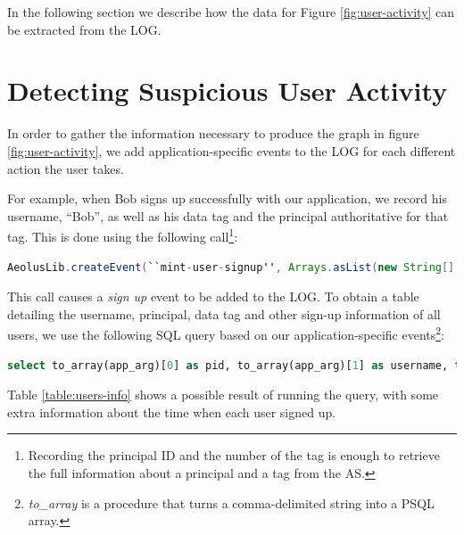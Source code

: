 In the following section we describe how the data for Figure \ref{fig:user-activity} can be extracted from the LOG.

\section{Detecting Suspicious User Activity}
\label{audit:mint-example}
In order to gather the information necessary to produce the graph in figure \ref{fig:user-activity}, we add application-specific events to the LOG for each different action the user takes.

For example, when Bob signs up successfully with our application, we record his username, ``Bob'', as well as his data tag and the principal authoritative for that tag. This is done using the following call\footnote{Recording the principal ID and the number of the tag is enough to retrieve the full information about a principal and a tag from the AS.}:

\begin{lstlisting}[language=Java, label=code:create-event]
  AeolusLib.createEvent(``mint-user-signup'', Arrays.asList(new String[] {``Bob'', ``5'', ``10''}));
\end{lstlisting}

\noindent
This call causes a \emph{sign up} event to be added to the LOG. To obtain a table detailing the username, principal, data tag and other sign-up information of all users, we use the following SQL query based on our application-specific events\footnote{\emph{to\_array} is a procedure that turns a comma-delimited string into a PSQL array.}:

\begin{lstlisting}[language=SQL, deletendkeywords={TIMESTAMP}, label=code:mint-signup]
select to_array(app_arg)[0] as pid, to_array(app_arg)[1] as username, to_array(app_arg)[2] as tag, timestamp as signed_up, event_counter from events where op_name='mint-user-signup'
\end{lstlisting}

\noindent
Table \ref{table:users-info} shows a possible result of running the query, with some extra information about the time when each user signed up.

